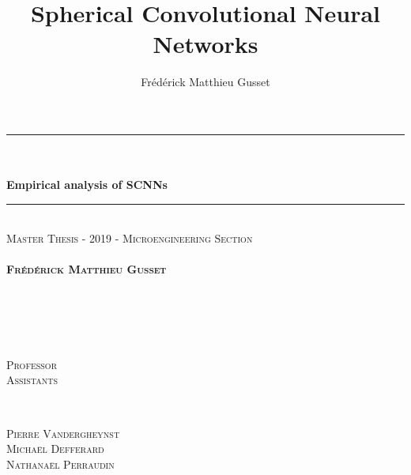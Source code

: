 \documentclass[11pt]{report}
\title{Spherical Convolutional Neural Networks}
\author{Frédérick Matthieu Gusset}
\makeatletter
\let\thetitle\@title
\makeatother
\begin{document}
\nocite{*}
\thispagestyle{empty}
\begin{center}
    \vspace*{0.5 cm}
    
	\rule{\linewidth}{0.2 mm} \\[0.4 cm]
    \vspace{10pt}
	{\huge \bfseries \thetitle}\\
    \vspace{10pt}
    { \large \bfseries Empirical analysis of SCNNs }
    \vspace{10pt}%
    
	\rule{\linewidth}{0.2 mm} \\[1 cm]
	
	{\large %
	\textsc{Master Thesis - 2019 - Microengineering Section\\[1 cm] }\\[1 cm]				%
    }
    \textsc{\bfseries Fr\'ed\'erick Matthieu Gusset}
	\\[1.7 cm]
	
	\begin{minipage}{0.1\textwidth}
		\begin{flushleft} \large
			\textsc{}\\
            \vspace{10pt}
            \textsc{} \\
			\vspace{10pt}
			\end{flushleft}
			\end{minipage}~
		\begin{minipage}{0.3\textwidth}
		\begin{flushleft} \large
			\textsc{Professor}\\
            \vspace{10pt}
            \textsc{Assistants} \\
			\vspace{10pt}
			\end{flushleft}
			\end{minipage}~
			\begin{minipage}{0.4\textwidth}
			\begin{flushright} 
			\vspace{10pt}\large
			\textsc{Pierre Vandergheynst}\\
            \vspace{10pt}
			\textsc{Michaël Defferard}\\
			\textsc{Nathanaël Perraudin}
		\end{flushright}
	\end{minipage}\\[2 cm]
	

\end{center}
\end{document}
